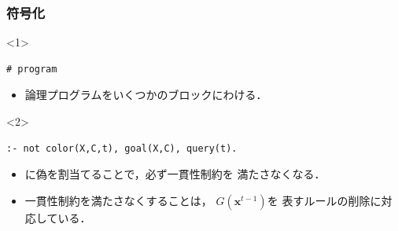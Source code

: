 \documentclass[dvipdfmx,11pt]{beamer}
\begin{document}
\begin{frame}[fragile]\frametitle{符号化}
  
  \begin{exampleblock}{}
    
  \end{exampleblock}

  \begin{onlyenv}<1>
    \begin{exampleblock}{}
      \begin{lstlisting}
# program
      \end{lstlisting}
    \end{exampleblock}
    \begin{itemize}
      \item 論理プログラムをいくつかのブロックにわける．
    \end{itemize}
    \begin{center}
      
    \end{center}
  \end{onlyenv}

  \begin{onlyenv}<2>
    \begin{exampleblock}{}
      \begin{lstlisting}
:- not color(X,C,t), goal(X,C), query(t).
      \end{lstlisting}
    \end{exampleblock}
    \begin{itemize}
      \item {}に偽を割当てることで，必ず一貫性制約を
            満たさなくなる．
      \item 一貫性制約を満たさなくすることは，
            $G(\bm{x}^{t -1})$を
            表すルールの削除に対応している．
    \end{itemize}
  \end{onlyenv}

\end{frame}
\end{document}
